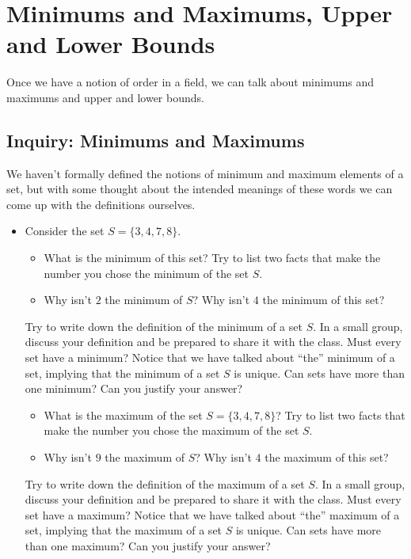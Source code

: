 \documentclass[11pt]{article}
\newenvironment{task}
	{\begin{mdframed}[linecolor=lightgray, linewidth=3pt]\raggedright}
	{\end{mdframed}}
\theoremstyle{definition}
\begin{document}
\section{Minimums and Maximums, Upper and Lower Bounds}

Once we have a notion of order in a field, we can talk about minimums and maximums and upper and lower bounds.

\subsection{Inquiry: Minimums and Maximums}
\begin{task}
  We haven't formally defined the notions of minimum and maximum elements of a set, but with some thought about the 
  intended meanings of these words we can come up with the definitions ourselves.
  \begin{itemize}
    \item Consider the set $S=\{3, 4, 7, 8 \}$. 
      \begin{itemize}
        \item What is the minimum of this set? Try to list two facts that make the number you chose the minimum of the set $S$.
        \item Why isn't $2$ the minimum of $S$? Why isn't $4$ the minimum of this set?
      \end{itemize}
      Try to write down the definition of the minimum of a set $S$. In a small group, discuss your definition and be prepared to share it
      with the class. Must every set have a minimum? Notice that we have talked about ``the'' minimum of a set, implying that the minimum 
      of a set $S$ is unique. Can sets have more than one minimum? Can you justify your answer?
      \begin{itemize}
        \item What is the maximum of the set $S=\{3,4,7,8\}$? Try to list two facts that make the number you chose the maximum of the set $S$.
        \item Why isn't $9$ the maximum of $S$? Why isn't $4$ the maximum of this set?
      \end{itemize}
      Try to write down the definition of the maximum of a set $S$. In a small group, discuss your definition and be prepared to share it
      with the class. Must every set have a maximum? Notice that we have talked about ``the'' maximum of a set, implying that the maximum 
      of a set $S$ is unique. Can sets have more than one maximum? Can you justify your answer?

\end{itemize}
\end{task}
\end{document}
